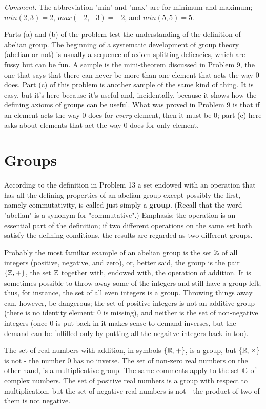 \textit{Comment.} The abbreviation "min" and "max" are for minimum and maximum; $min(2,3) = 2$, $max(-2,-3) = -2$, and $min(5,5) = 5$.

Parts (a) and (b) of the problem test the understanding of the definition of abelian group. The beginning of a systematic development of group theory (abelian or not) is usually a sequence of axiom splitting delicacies, which are fussy but can be fun. A sample is the mini-theorem discussed in Problem 9, the one that says that there can never be more than one element that acts the way $0$ does. Part (c) of this problem is another sample of the same kind of thing. It is easy, but it's here because it's useful and, incidentally, because it shows how the defining axioms of groups can be useful. What was proved in Problem 9 is that if an element acts the way $0$ does for \textit{every} element, then it must be 0; part (c) here asks about elements that act the way 0 does for only  element.

\section{Groups}

According to the definition in Problem 13 a set endowed with an operation that has all the defining properties of an abelian group except possibly the first, namely commutativity, is called just simply a \textbf{group}. (Recall that the word "abelian" is a synonym for "commutative".) Emphasis: the operation is an essential part of the definition; if two different operations on the same set both satisfy the defining conditions, the results are regarded as two different groups.

Probably the most familiar example of an abelian group is the set $\mathbb{Z}$ of all integers (positive, negative, and zero), or, better said, the group is the pair $\{\mathbb{Z}, + \}$, the set $\mathbb{Z}$ together with, endowed with, the operation of addition. It is sometimes possible to throw away some of the integers and still have a group left; thus, for instance, the set of all even integers is a group. Throwing things away can, however, be dangerous; the set of positive integers is not an additive group (there is no identity element: 0 is missing), and neither is the set of non-negative integers (once 0 is put back in it makes sense to demand inverses, but the demand can be fulfilled only by putting all the negaitve integers back in too).

The set of real numbers with addition, in symbols $\{\mathbb{R}, +\}$, is a group, but $\{\mathbb{R}, \times\}$ is not - the number 0 has no inverse. The set of non-zero real numbers on the other hand, is a multiplicative group. The same comments apply to the set $\mathbb{C}$ of complex numbers. The set of positive real numbers is a group with respect to multiplication, but the set of negative real numbers is not - the product of two of them is not negative.

